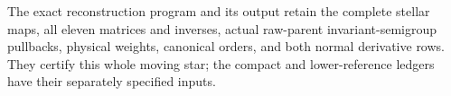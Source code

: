 The exact reconstruction program
 and its output
 retain the complete
stellar maps, all eleven matrices and inverses, actual raw-parent
invariant-semigroup pullbacks, physical weights, canonical orders,
and both normal derivative rows. They certify this whole moving
star; the compact and lower-reference ledgers have their separately
specified inputs.
